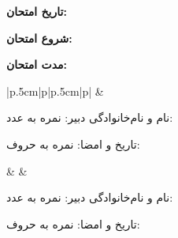 {{\begin{minipage}{.3333\dimexpr\linewidth-2\fboxsep-2\fboxrule-10pt\relax}
		\textbf{تاریخ امتحان: \nameordot{\hfill\exam@date}}
		\par\vspace{3mm}
		\textbf{شروع امتحان: \nameordot\ex@mtime}
		\par\vspace{3mm}
		\textbf{مدت امتحان: \nameordot{\hfill\answer@time}}
	\end{minipage}%
}%
\setlength\colwidth{\dimexpr(\linewidth-2pt-1cm)/2\relax}
%
\begin{tabular}{|p{.5cm}|p{\colwidth}|p{.5cm}|p{\colwidth}|}
	\hline
	\vskip-10pt%
	&
	\parbox[c][][b]{\linewidth}{%
		\vspace{5pt}
		نام و نام‌خانوادگی دبیر:
		\hfill
		نمره به عدد:
		\hspace*{1cm}\par\vspace*{5mm}
		تاریخ و امضا:
		\hfill
		نمره به حروف:
		\hspace*{2.5cm}}
	&
	&	
	\parbox[c][][b]{\linewidth}{%
		\vspace{5pt}
		نام و نام‌خانوادگی دبیر:
		\hfill
		نمره به عدد:
		\hspace*{1cm}\par\vspace*{5mm}
		تاریخ و امضا:
		\hfill
		نمره به حروف:
		\hspace*{2.5cm}}
	\\ \hline
\end{tabular}%
}
